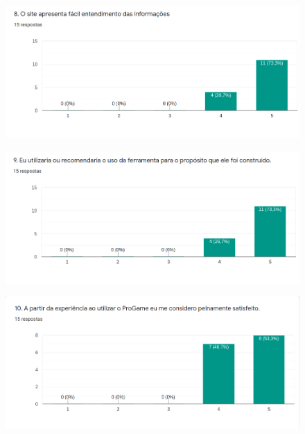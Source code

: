 \begin{apendicesenv}
\begin{figure}[h]
	\centering
	\includegraphics[keepaspectratio=true,scale=0.9]{figuras/8.png}
\end{figure}

\begin{figure}[h]
	\centering
	\includegraphics[keepaspectratio=true,scale=0.9]{figuras/9.png}
\end{figure}

\begin{figure}[h]
	\centering
	\includegraphics[keepaspectratio=true,scale=0.9]{figuras/10.png}
\end{figure}



\end{apendicesenv}
